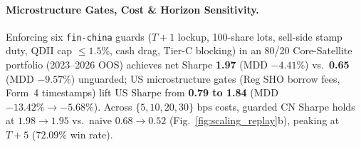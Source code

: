 \paragraph{Microstructure Gates, Cost \& Horizon Sensitivity.}
Enforcing six \texttt{fin-china} guards ($T+1$ lockup, 100-share lots, sell-side stamp duty, QDII cap $\le 1.5\%$, cash drag, Tier-C blocking) in an 80/20 Core-Satellite portfolio (2023--2026 OOS) achieves net Sharpe \textbf{1.97} (MDD $-4.41\%$) vs.\ \textbf{0.65} (MDD $-9.57\%$) unguarded; US microstructure gates (Reg SHO borrow fees, Form~4 timestamps) lift US Sharpe from \textbf{0.79 to 1.84} (MDD $-13.42\% \to -5.68\%$). Across $\{5, 10, 20, 30\}\text{ bps}$ costs, guarded CN Sharpe holds at $1.98 \to 1.95$ vs.\ naive $0.68 \to 0.52$ (Fig.~\ref{fig:scaling_replay}b), peaking at $T+5$ ($72.09\%$ win rate).
\vspace{-0.12cm}
